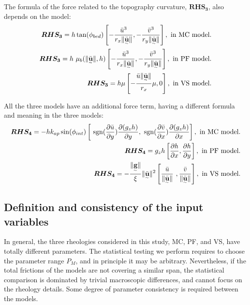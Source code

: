 \documentclass{article}
\begin{document}
The formula of the force related to the topography curvature, $\boldsymbol{RHS_3}$, also depends on the model:
\begin{align}
\boldsymbol{RHS_3} = h \tan(\phi_{bed})\left[-\frac{\bar{u}^3}{r_x\| \underset{^\sim}{\bar{\textbf{u}}} \|}, -\frac{\bar{v}^3}{r_y\| \underset{^\sim}{\bar{\textbf{u}}} \|}\right],\textmd{ in MC model.}\nonumber\\
\boldsymbol{RHS_3} = h\ \mu_{b}(\|\underset{^\sim}{\bar{\textbf{u}}} \|,h)\left[-\frac{\bar{u}^3}{r_x\| \underset{^\sim}{\bar{\textbf{u}}} \|}, -\frac{\bar{v}^3}{r_y\| \underset{^\sim}{\bar{\textbf{u}}} \|}\right],\textmd{ in PF model.}\\
\boldsymbol{RHS_3} = h \mu\left[- \frac{\bar{u}\| \underset{^\sim}{\bar{\textbf u}} \|}{r_{x}} \mu,0\right],\textmd{ in VS model.}\nonumber
\end{align}

All the three models have an additional force term, having a different formula and meaning in the three models:
\begin{align}
\boldsymbol{RHS_4} =  - h k_{ap}\sin(\phi_{int})\left[ \ {\rm sgn}(\frac{\partial \bar{u}}{\partial y}) \frac{\partial (g_z h)}{\partial y},\ {\rm sgn}({\frac{\partial \bar{v}}{\partial x}}) \frac{\partial (g_z h)}{\partial x}\right],\textmd{ in MC model.}\nonumber\\
\boldsymbol{RHS_4} = g_{z}h\left[\frac{\partial h}{\partial x}, \frac{\partial h}{\partial y}\right],\textmd{ in PF model.}\\
\boldsymbol{RHS_4} = -\frac{\| \underset{^\sim}{\textbf g} \|}{\xi}\| \underset{^\sim}{\bar{\textbf u}} \|^2\left[\frac{\bar{u}}{\| \underset{^\sim}{\bar{\textbf u}}\|} \ ,\frac{\bar{v}}{\| \underset{^\sim}{\bar{\textbf u}}\|}\right],\textmd{ in VS model.}\nonumber
\end{align}

\newpage
\subsection{Definition and consistency of the input variables}\label{consistency}
In general, the three rheologies considered in this study, MC, PF, and VS, have totally different parameters. The statistical testing we perform requires to choose the parameter range $P_M$, and in principle it may be arbitrary. Nevertheless, if the total frictions of the models are not covering a similar span, the statistical comparison is dominated by trivial macroscopic differences, and cannot focus on the rheology details. Some degree of parameter consistency is required between the models.
\end{document}
